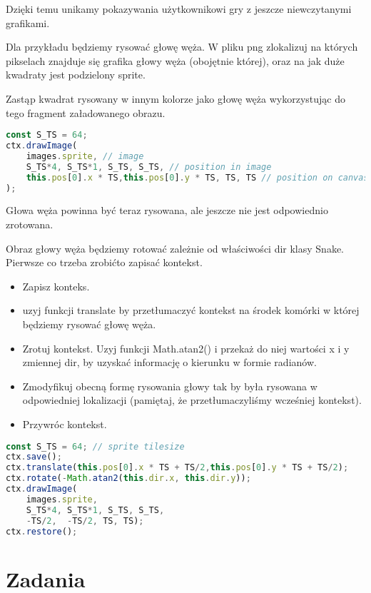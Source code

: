 \documentclass[12pt]{article}
\begin{document}
Dzięki temu unikamy pokazywania użytkownikowi gry z jeszcze niewczytanymi grafikami.

Dla przykładu będziemy rysować głowę węża. W pliku png zlokalizuj na których pikselach znajduje się grafika głowy węża (obojętnie której), oraz na jak duże kwadraty jest podzielony sprite.

Zastąp kwadrat rysowany w innym kolorze jako głowę węża wykorzystując do tego fragment załadowanego obrazu.

\begin{lstlisting}[language=JavaScript]
const S_TS = 64;
ctx.drawImage(
    images.sprite, // image
    S_TS*4, S_TS*1, S_TS, S_TS, // position in image
    this.pos[0].x * TS,this.pos[0].y * TS, TS, TS // position on canvas
);
\end{lstlisting}

Głowa węża powinna być teraz rysowana, ale jeszcze nie jest odpowiednio zrotowana.

Obraz głowy węża będziemy rotować zależnie od właściwości dir klasy Snake. Pierwsze co trzeba zrobićto zapisać kontekst.
\begin{itemize}
    \item Zapisz konteks.
    \item uzyj funkcji translate by przetłumaczyć kontekst na środek komórki w której będziemy rysować głowę węża.
    \item Zrotuj kontekst. Uzyj funkcji Math.atan2() i przekaż do niej wartości x i y zmiennej dir, by uzyskać informację o kierunku w formie radianów.
    \item Zmodyfikuj obecną formę rysowania głowy tak by była rysowana w odpowiedniej lokalizacji (pamiętaj, że przetłumaczyliśmy wcześniej kontekst).
    \item Przywróc kontekst.
\end{itemize}

\begin{lstlisting}[language=JavaScript]
const S_TS = 64; // sprite tilesize
ctx.save();
ctx.translate(this.pos[0].x * TS + TS/2,this.pos[0].y * TS + TS/2);
ctx.rotate(-Math.atan2(this.dir.x, this.dir.y));
ctx.drawImage(
    images.sprite,
    S_TS*4, S_TS*1, S_TS, S_TS, 
    -TS/2,  -TS/2, TS, TS);
ctx.restore();
\end{lstlisting}


\section{Zadania}
\end{document}
